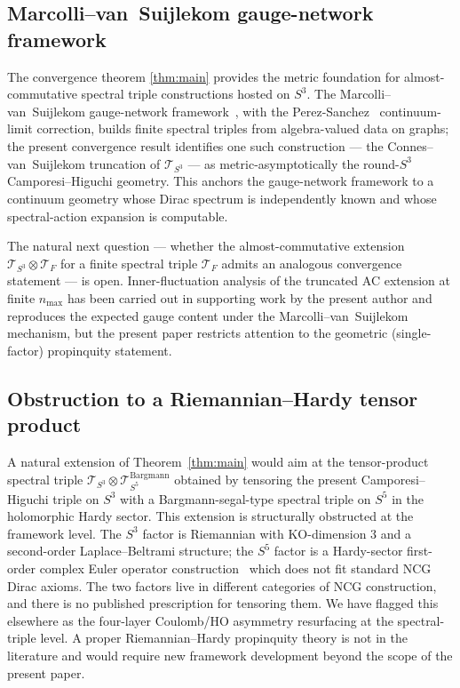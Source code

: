 \documentclass[11pt,a4paper]{article}
\theoremstyle{plain}
\theoremstyle{definition}
\newcommand{\nmax}{n_{\max}}
\newcommand{\sthree}{S^{3}}
\newcommand{\Tcal}{\mathcal{T}}
\begin{document}
\subsection{Marcolli--van~Suijlekom gauge-network framework}
\label{sec:marcolli_vs}

The convergence theorem
\ref{thm:main} provides the metric foundation for almost-commutative
spectral triple constructions hosted on $\sthree$. The
Marcolli--van~Suijlekom gauge-network
framework~\cite{marcolli_vs2014}, with the
Perez-Sanchez~\cite{perez_sanchez2024, perez_sanchez2025} continuum-limit
correction, builds finite spectral triples from algebra-valued data on
graphs;
the present convergence result identifies one such construction --- the
Connes--van~Suijlekom truncation of $\Tcal_{\sthree}$ --- as
metric-asymptotically the round-$\sthree$ Camporesi--Higuchi
geometry. This anchors the gauge-network framework to a continuum
geometry whose Dirac spectrum is independently known and whose
spectral-action expansion is computable.

The natural next question --- whether the almost-commutative extension
$\Tcal_{\sthree} \otimes \Tcal_F$ for a finite spectral triple
$\Tcal_F$ admits an analogous convergence statement --- is open.
Inner-fluctuation analysis of the truncated AC extension at finite
$\nmax$ has been carried out in supporting work by the present
author and reproduces the expected gauge content under the
Marcolli--van~Suijlekom mechanism, but the present paper restricts
attention to the geometric (single-factor) propinquity statement.

\subsection{Obstruction to a Riemannian--Hardy tensor product}
\label{sec:obstruction}

A natural extension of Theorem~\ref{thm:main} would aim at the
tensor-product spectral triple $\Tcal_{\sthree} \otimes
\Tcal_{S^5}^{\mathrm{Bargmann}}$ obtained by tensoring the present
Camporesi--Higuchi triple on $\sthree$ with a Bargmann-segal-type
spectral triple on $S^5$ in the holomorphic Hardy sector. This
extension is structurally obstructed at the framework level. The
$\sthree$ factor is Riemannian with KO-dimension $3$ and a
second-order Laplace--Beltrami structure; the $S^5$ factor is a
Hardy-sector first-order complex Euler operator
construction~\cite{paper24} which does not fit standard NCG Dirac
axioms. The two factors live in different categories of NCG
construction, and there is no published prescription for tensoring
them. We have flagged this elsewhere as the four-layer
Coulomb/HO asymmetry resurfacing at the spectral-triple level. A
proper Riemannian--Hardy propinquity theory is not in the literature
and would require new framework development beyond the scope of the
present paper.
\end{document}
